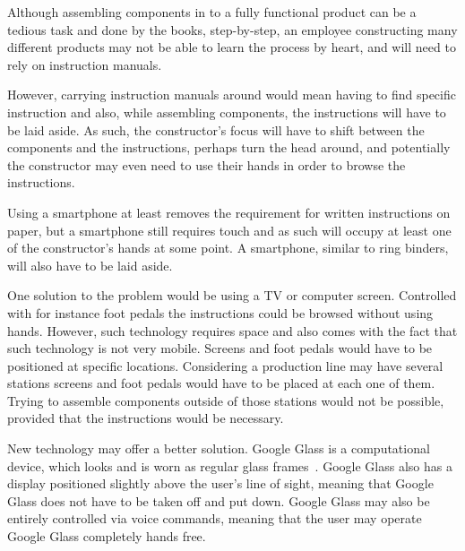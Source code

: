 %
%
%
%
%

Although assembling components in to a fully functional product can be a tedious task and done by the books, step-by-step, an employee constructing many different products may not be able to learn the process by heart, and will need to rely on instruction manuals.

However, carrying instruction manuals around would mean having to find specific instruction and also, while assembling components, the instructions will have to be laid aside. As such, the constructor's focus will have to shift between the components and the instructions, perhaps turn the head around, and potentially the constructor may even need to use their hands in order to browse the instructions. 

Using a smartphone at least removes the requirement for written instructions on paper, but a smartphone still requires touch and as such will occupy at least one of the constructor's hands at some point. A smartphone, similar to ring binders, will also have to be laid aside.

One solution to the problem would be using a TV or computer screen. Controlled with for instance foot pedals the instructions could be browsed without using hands. However, such technology requires space and also comes with the fact that such technology is not very mobile. Screens and foot pedals would have to be positioned at specific locations. Considering a production line may have several stations screens and foot pedals would have to be placed at each one of them. Trying to assemble components outside of those stations would not be possible, provided that the instructions would be necessary.

New technology may offer a better solution. Google Glass is a computational device, which looks and is worn as regular glass frames~\cite{glassStart}. Google Glass also has a display positioned slightly above the user's line of sight, meaning that Google Glass does not have to be taken off and put down. Google Glass may also be entirely controlled via voice commands, meaning that the user may operate Google Glass completely hands free.

